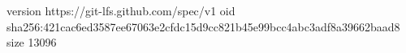 version https://git-lfs.github.com/spec/v1
oid sha256:421cac6ed3587ee67063e2cfdc15d9cc821b45e99bcc4abc3adf8a39662baad8
size 13096
